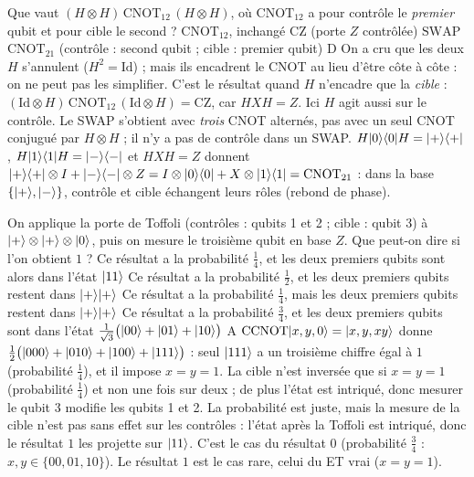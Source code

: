   {Que vaut $(H\otimes H)\,\mathrm{CNOT}_{12}\,(H\otimes H)$, où $\mathrm{CNOT}_{12}$ a pour contrôle le \emph{premier} qubit et pour cible le second ?}
  {$\mathrm{CNOT}_{12}$, inchangé}
  {$\mathrm{CZ}$ (porte $Z$ contrôlée)}
  {$\mathrm{SWAP}$}
  {$\mathrm{CNOT}_{21}$ (contrôle : second qubit ; cible : premier qubit)}
  {D}
\qcmx
  {On a cru que les deux $H$ s'annulent ($H^2=\mathrm{Id}$) ; mais ils encadrent le CNOT au lieu d'être côte à côte : on ne peut pas les simplifier.}
  {C'est le résultat quand $H$ n'encadre que la \emph{cible} : $(\mathrm{Id}\otimes H)\,\mathrm{CNOT}_{12}\,(\mathrm{Id}\otimes H)=\mathrm{CZ}$, car $HXH=Z$. Ici $H$ agit aussi sur le contrôle.}
  {Le SWAP s'obtient avec \emph{trois} CNOT alternés, pas avec un seul CNOT conjugué par $H\otimes H$ ; il n'y a pas de contrôle dans un SWAP.}
  {$H|0\rangle\langle 0|H=|+\rangle\langle +|$, $H|1\rangle\langle 1|H=|-\rangle\langle -|$ et $HXH=Z$ donnent $|+\rangle\langle +|\otimes I+|-\rangle\langle -|\otimes Z=I\otimes|0\rangle\langle 0|+X\otimes|1\rangle\langle 1|=\mathrm{CNOT}_{21}$ : dans la base $\{|+\rangle,|-\rangle\}$, contrôle et cible échangent leurs rôles (rebond de phase).}

  {On applique la porte de Toffoli (contrôles : qubits 1 et 2 ; cible : qubit 3) à $|+\rangle\otimes|+\rangle\otimes|0\rangle$, puis on mesure le troisième qubit en base $Z$. Que peut-on dire si l'on obtient $1$ ?}
  {Ce résultat a la probabilité $\frac14$, et les deux premiers qubits sont alors dans l'état $|11\rangle$}
  {Ce résultat a la probabilité $\frac12$, et les deux premiers qubits restent dans $|+\rangle|+\rangle$}
  {Ce résultat a la probabilité $\frac14$, mais les deux premiers qubits restent dans $|+\rangle|+\rangle$}
  {Ce résultat a la probabilité $\frac34$, et les deux premiers qubits sont dans l'état $\frac{1}{\sqrt3}\big(|00\rangle+|01\rangle+|10\rangle\big)$}
  {A}
\qcmx
  {$\mathrm{CCNOT}|x,y,0\rangle=|x,y,xy\rangle$ donne $\frac12\big(|000\rangle+|010\rangle+|100\rangle+|111\rangle\big)$ : seul $|111\rangle$ a un troisième chiffre égal à $1$ (probabilité $\frac14$), et il impose $x=y=1$.}
  {La cible n'est inversée que si $x=y=1$ (probabilité $\frac14$) et non une fois sur deux ; de plus l'état est intriqué, donc mesurer le qubit 3 modifie les qubits 1 et 2.}
  {La probabilité est juste, mais la mesure de la cible n'est pas sans effet sur les contrôles : l'état après la Toffoli est intriqué, donc le résultat $1$ les projette sur $|11\rangle$.}
  {C'est le cas du résultat $0$ (probabilité $\frac34$ : $x,y\in\{00,01,10\}$). Le résultat $1$ est le cas rare, celui du ET vrai ($x=y=1$).}

